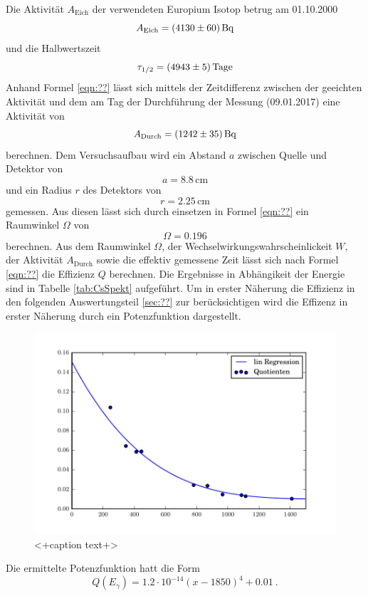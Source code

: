 Die Aktivität $A_\text{Eich}$ der verwendeten Europium Isotop betrug am 01.10.2000
\begin{equation}
  A_\text{Eich} = (\num{4130 +- 60}) \, \text{Bq} 
  \label{eqn:AktEu}
\end{equation}
und die Halbwertszeit
\begin{equation}
  \tau_{1/2} = (\num{4943 +- 5}) \, \text{Tage} 
  \label{eqn:halb}
\end{equation}
Anhand Formel \ref{eqn:??} lässt sich mittels der Zeitdifferenz zwischen der geeichten Aktivität und dem am Tag der Durchführung der Messung (09.01.2017) eine Aktivität von 
\begin{equation}
  A_\text{Durch} = (\num{1242 +- 35}) \, \text{Bq}
  \label{eqn:AktEEu}
\end{equation}
berechnen. Dem Versuchsaufbau wird ein Abstand $a$ zwischen Quelle und Detektor von 
\begin{equation}
  a = 8.8 \, \text{cm}
  \label{<++>}
\end{equation}
und ein Radius $r$ des Detektors von
\begin{equation}
  r = 2.25 \, \text{cm} 
  \label{<++>}
\end{equation}
gemessen. Aus diesen lässt sich durch einsetzen in Formel \ref{eqn:??} ein Raumwinkel $\Omega$ von 
\begin{equation}
  \Omega = 0.196 
  \label{eqn:Raum}
\end{equation}
berechnen. Aus dem Raumwinkel $\Omega$, der Wechselwirkungswahrscheinlickeit $W$, der Aktivität $A_\text{Durch}$ sowie die effektiv gemessene Zeit lässt sich nach Formel \ref{eqn:??} die Effizienz $Q$ berechnen. Die Ergebnisse in Abhängikeit der Energie sind in Tabelle \ref{tab:CsSpekt} aufgeführt. Um in erster Näherung die Effizienz in den folgenden Auswertungsteil \ref{sec:??} zur berücksichtigen wird die Effizenz in erster Näherung durch ein Potenzfunktion dargestellt. 
\begin{figure}[H]
  \centering
  \includegraphics[width=\textwidth]{./build/Effizienz.pdf}
  \caption{<+caption text+>}
  \label{fig:<+label+>}
\end{figure}
Die ermittelte Potenzfunktion hatt die Form 
\begin{equation}
  Q(E_\gamma)= 1.2 \cdot 10^{-14} \left( x - 1850 \right)^4 + 0.01 \ .
  \label{eqn:QCs}
\end{equation}
